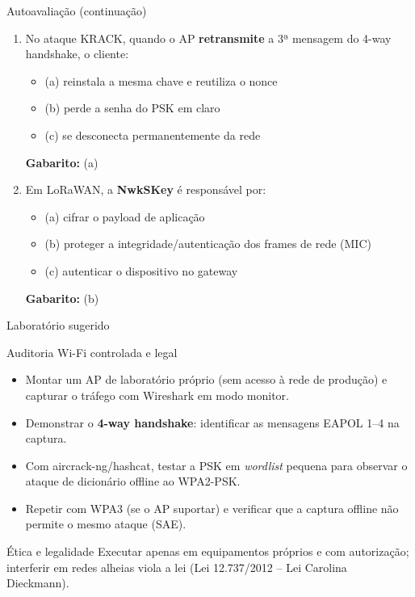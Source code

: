 \documentclass[aspectratio=169,11pt]{beamer}
\begin{document}
\begin{frame}{Autoavaliação (continuação)}
  \begin{enumerate}
    \item No ataque KRACK, quando o AP \textbf{retransmite} a 3ª mensagem do 4-way handshake, o cliente:
      \begin{itemize}
        \item (a) reinstala a mesma chave e reutiliza o nonce
        \item (b) perde a senha do PSK em claro
        \item (c) se desconecta permanentemente da rede
      \end{itemize}
      \pause
      \textbf{Gabarito:} (a)

    \item Em LoRaWAN, a \textbf{NwkSKey} é responsável por:
      \begin{itemize}
        \item (a) cifrar o payload de aplicação
        \item (b) proteger a integridade/autenticação dos frames de rede (MIC)
        \item (c) autenticar o dispositivo no gateway
      \end{itemize}
      \pause
      \textbf{Gabarito:} (b)
  \end{enumerate}
\end{frame}

\begin{frame}{Laboratório sugerido}
  \begin{block}{Auditoria Wi-Fi controlada e legal}
    \begin{itemize}
      \item Montar um AP de laboratório próprio (sem acesso à rede de produção) e capturar o tráfego com Wireshark em modo monitor.
      \item Demonstrar o \textbf{4-way handshake}: identificar as mensagens EAPOL 1--4 na captura.
      \item Com aircrack-ng/hashcat, testar a PSK em \emph{wordlist} pequena para observar o ataque de dicionário offline ao WPA2-PSK.
      \item Repetir com WPA3 (se o AP suportar) e verificar que a captura offline não permite o mesmo ataque (SAE).
    \end{itemize}
  \end{block}
  \begin{alertblock}{Ética e legalidade}
    Executar apenas em equipamentos próprios e com autorização; interferir em redes alheias viola a lei (Lei 12.737/2012 -- Lei Carolina Dieckmann).
  \end{alertblock}
\end{frame}
\end{document}
